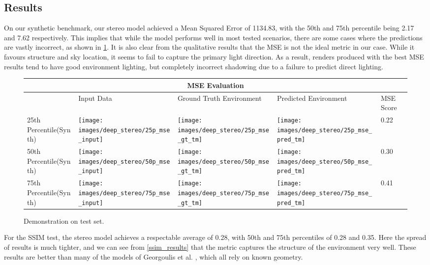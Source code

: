 \documentclass[ %
                    author={Gavin Parker},
                supervisor={Dr. Neill Campbell},
                    degree={MEng},
                     title={Deep Siamese Networks for Illumination Estimation from Stereo Images},
                  subtitle={},
                      type={Research},
                      year={2018} ]{dissertation}
\begin{document}
\subsection{Results}
On our synthetic benchmark, our stereo model achieved a Mean Squared Error of 1134.83, with the 50th and 75th percentile being 2.17 and 7.62 respectively. This implies that while the model performs well in most tested scenarios, there are some cases where the predictions are vastly incorrect, as shown in \ref{mse_results}. It is also clear from the qualitative results that the MSE is not the ideal metric in our case. While it favours structure and sky location, it seems to fail to capture the primary light direction. As a result, renders produced with the best MSE results tend to have good environment lighting, but completely incorrect shadowing due to a failure to predict direct lighting.
\newline
\begin{figure}[H]
\centering
\begin{tabular}{ |p{3cm}||p{3cm}|p{3cm}|p{3cm}|p{3cm}|  }
 \hline
 \multicolumn{5}{|c|}{MSE Evaluation} \\
 \hline
  & Input Data &Ground Truth Environment&Predicted Environment&MSE Score\\
 \hline
 25th Percentile(Synth)&\parbox[c]{1em}{
 \texttt{[image: images/deep\_stereo/25p\_mse\_input]}}&\parbox[c]{1em}{\texttt{[image: images/deep\_stereo/25p\_mse\_gt\_tm]}}&
\parbox[c]{1em}{\texttt{[image: images/deep\_stereo/25p\_mse\_pred\_tm]}}& 0.22\\
 50th Percentile(Synth)&\parbox[c]{1em}{
 \texttt{[image: images/deep\_stereo/50p\_mse\_input]}}&\parbox[c]{1em}{\texttt{[image: images/deep\_stereo/50p\_mse\_gt\_tm]}}&
\parbox[c]{1em}{\texttt{[image: images/deep\_stereo/50p\_mse\_pred\_tm]}}& 0.30\\
 75th Percentile(Synth)&\parbox[c]{1em}{
 \texttt{[image: images/deep\_stereo/75p\_mse\_input]}}&\parbox[c]{1em}{\texttt{[image: images/deep\_stereo/75p\_mse\_gt\_tm]}}&
\parbox[c]{1em}{\texttt{[image: images/deep\_stereo/75p\_mse\_pred\_tm]}}& 0.41\\
 \hline
\end{tabular}

\label{mse_results}
\caption{Demonstration on test set.}

\end{figure}
For the SSIM test, the stereo model achieves a respectable average of 0.28, with 50th and 75th percentiles of 0.28 and 0.35. Here the spread of results is much tighter, and we can see from \ref{ssim_results} that the metric captures the structure of the environment very well. These results are better than many of the models of Georgoulis et al. \cite{Georgoulis_2017_ICCV}, which all rely on known geometry.
\end{document}
